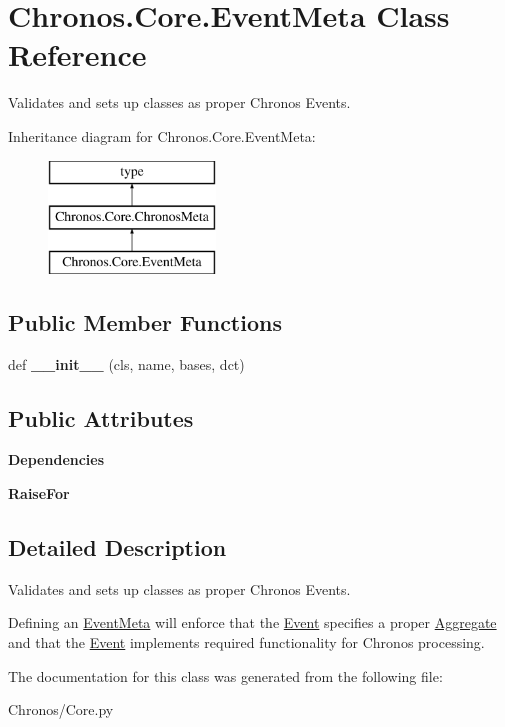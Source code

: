\hypertarget{classChronos_1_1Core_1_1EventMeta}{}\section{Chronos.\+Core.\+Event\+Meta Class Reference}
\label{classChronos_1_1Core_1_1EventMeta}


Validates and sets up classes as proper Chronos Events.  


Inheritance diagram for Chronos.\+Core.\+Event\+Meta\+:\begin{figure}[H]
\begin{center}
\leavevmode
\includegraphics[height=3.000000cm]{classChronos_1_1Core_1_1EventMeta}
\end{center}
\end{figure}
\subsection*{Public Member Functions}
\begin{DoxyCompactItemize}
\item 
def {\bfseries \+\_\+\+\_\+init\+\_\+\+\_\+} (cls, name, bases, dct)
\end{DoxyCompactItemize}
\subsection*{Public Attributes}
\begin{DoxyCompactItemize}
\item 
{\bfseries Dependencies}
\item 
{\bfseries Raise\+For}
\end{DoxyCompactItemize}


\subsection{Detailed Description}
Validates and sets up classes as proper Chronos Events. 

Defining an \hyperlink{classChronos_1_1Core_1_1EventMeta}{Event\+Meta} will enforce that the \hyperlink{classChronos_1_1Core_1_1Event}{Event} specifies a proper \hyperlink{classChronos_1_1Core_1_1Aggregate}{Aggregate} and that the \hyperlink{classChronos_1_1Core_1_1Event}{Event} implements required functionality for Chronos processing. 

The documentation for this class was generated from the following file\+:\begin{DoxyCompactItemize}
\item 
Chronos/Core.\+py\end{DoxyCompactItemize}
